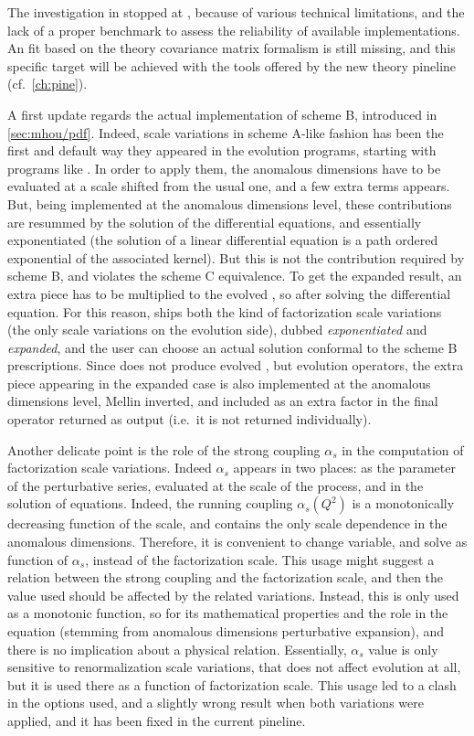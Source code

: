 
The investigation in \cite{NNPDF:2019ubu} stopped at \nlo, because of various
technical limitations, and the lack of a proper benchmark to assess the
reliability of available implementations.
%
An \nnlo fit based on the theory covariance matrix formalism is still missing,
and this specific target will be achieved with the tools offered by the new
theory pineline (cf.\ \cref{ch:pine}).

A first update regards the actual implementation of scheme B, introduced in
\cref{sec:mhou/pdf}.
Indeed, scale variations in scheme A-like fashion has been the first and
default way they appeared in the evolution programs, starting with programs
like \pegasus.
In order to apply them, the \pdf anomalous dimensions have to be evaluated at a
scale shifted from the usual one, and a few extra terms appears.
%
But, being implemented at the anomalous dimensions level, these contributions
are resummed by the solution of the differential equations, and essentially
exponentiated (the solution of a linear differential equation is a path ordered
exponential of the associated kernel).
%
But this is not the contribution required by scheme B, and violates the scheme
C equivalence.
To get the expanded result, an extra piece has to be multiplied to the evolved
\pdf, so after solving the differential equation.
%
For this reason, \eko ships both the kind of factorization scale variations
(the only scale variations on the evolution side), dubbed
\textit{exponentiated} and \textit{expanded}, and the user can choose an actual
solution conformal to the scheme B prescriptions.
%
Since \eko does not produce evolved \pdfs, but evolution operators, the extra
piece appearing in the expanded case is also implemented at the anomalous
dimensions level, Mellin inverted, and included as an extra factor in the final
operator returned as output (i.e.\ it is not returned individually).

Another delicate point is the role of the strong coupling $\alpha_s$ in the
computation of factorization scale variations.
Indeed $\alpha_s$ appears in two places: as the parameter of the perturbative
series, evaluated at the scale of the process, and in the solution of \dglap
equations.
%
Indeed, the running coupling $\alpha_s(Q^2)$ is a monotonically decreasing
function of the scale, and contains the only scale dependence in the anomalous
dimensions.
Therefore, it is convenient to change variable, and solve \dglap as function of
$\alpha_s$, instead of the factorization scale.
%
This usage might suggest a relation between the strong coupling and the
factorization scale, and then the value used should be affected by the
related variations.
Instead, this is only used as a monotonic function, so for its mathematical
properties and the role in the equation (stemming from anomalous dimensions
perturbative expansion), and there is no implication about a physical relation.
%
Essentially, $\alpha_s$ value is only sensitive to renormalization scale
variations, that does not affect evolution at all, but it is used there as a
function of factorization scale.
This usage led to a clash in the options used, and a slightly wrong result when
both variations were applied, and it has been fixed in the current pineline.

